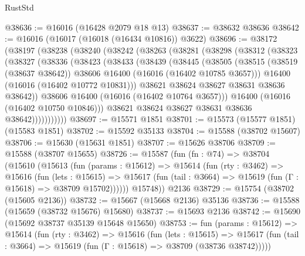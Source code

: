 \begin{lexlean}{RustStd}
\begin{coremodule}
@38636 := @16016 (@16428 @2079 @18 @13)
@38637 := @38632 @38636
@38642 := @16016 (@16017 (@16018 (@16434 @10816)) @3622)
@38696 := @38172
    (@38197
      (@38238
        (@38240
          (@38242
            (@38263
              (@38281
                (@38298
                  (@38312
                    (@38323
                      (@38327
                        (@38336
                          (@38423
                            (@38433
                              (@38439
                                (@38445
                                  (@38505
                                    (@38515
                                      (@38519 (@38637 @38642))
                                      @38606
                                      @16400
                                      (@16016 (@16402 @10785 @3657)))
                                    @16400
                                    (@16016 (@16402 @10772 @10831)))
                                  @38621
                                  @38624
                                  @38627
                                  @38631
                                  @38636
                                  @38642))
                              @38606
                              @16400
                              (@16016 (@16402 @10764 @3657)))
                            @16400
                            (@16016 (@16402 @10750 @10846)))
                          @38621
                          @38624
                          @38627
                          @38631
                          @38636
                          @38642)))))))))))
@38697 := @15571 @1851
@38701 := @15573 (@15577 @1851) (@15583 @1851)
@38702 := @15592 @35133
@38704 := @15588 (@38702 @15607)
@38706 := @15630 (@15631 @1851)
@38707 := @15626 @38706
@38709 := @15588 (@38707 @15655)
@38726 := @15587
    (fun (fn : @74) =>
    @38704
      (@15610
        (@15613
          (fun (params : @15612) =>
          @15614
            (fun (rty : @3462) =>
            @15616
              (fun (lets : @15615) =>
              @15617 (fun (tail : @3664) => @15619 (fun (Γ : @15618) => @38709 @15702))))))
        @15748))
    @2136
@38729 := @15754 (@38702 (@15605 @2136))
@38732 := @15667 (@15668 @2136) @35136
@38736 := @15588 (@15659 (@38732 @15676) @15680)
@38737 := @15693 @2136
@38742 := @15690 (@15692 @38737 @35139 @15648 @15650)
@38753 := fun (params : @15612) =>
  @15614
    (fun (rty : @3462) =>
    @15616
      (fun (lets : @15615) =>
      @15617 (fun (tail : @3664) => @15619 (fun (Γ : @15618) => @38709 (@38736 @38742)))))

\end{coremodule}
\end{lexlean}
